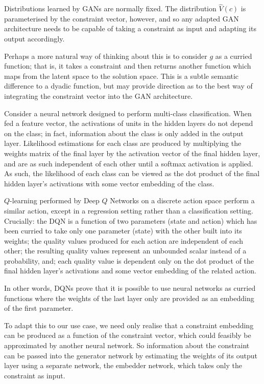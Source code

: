\documentclass[../../main.tex]{subfiles}
\begin{document}
Distributions learned by GANs are normally fixed.
The distribution $\hat{V}(c)$ is parameterised by the constraint vector, however, and so any adapted GAN architecture needs to be capable of taking a constraint as input and adapting its output accordingly.

Perhaps a more natural way of thinking about this is to consider $g$ as a curried function; that is, it takes a constraint and then returns another function which maps from the latent space to the solution space.
This is a subtle semantic difference to a dyadic function, but may provide direction as to the best way of integrating the constraint vector into the GAN architecture.

Consider a neural network designed to perform multi-class classification.
When fed a feature vector, the activations of units in the hidden layers do not depend on the class; in fact, information about the class is only added in the output layer.
Likelihood estimations for each class are produced by multiplying the weights matrix of the final layer by the activation vector of the final hidden layer, and are as such independent of each other until a softmax activation is applied.
As such, the likelihood of each class can be viewed as the dot product of the final hidden layer's activations with some vector embedding of the class.

$Q$-learning performed by Deep $Q$ Networks on a discrete action space perform a similar action, except in a regression setting rather than a classification setting.
Crucially: the DQN is a function of two parameters (state and action) which has been curried to take only one parameter (state) with the other built into its weights; the quality values produced for each action are independent of each other; the resulting quality values represent an unbounded scalar instead of a probability, and; each quality value is dependent only on the dot product of the final hidden layer's activations and some vector embedding of the related action.

In other words, DQNs prove that it is possible to use neural networks as curried functions where the weights of the last layer only are provided as an embedding of the first parameter.

To adapt this to our use case, we need only realise that a constraint embedding can be produced as a function of the constraint vector, which could feasibly be approximated by another neural network.
So information about the constraint can be passed into the generator network by estimating the weights of its output layer using a separate network, the embedder network, which takes only the constraint as input.
\end{document}
